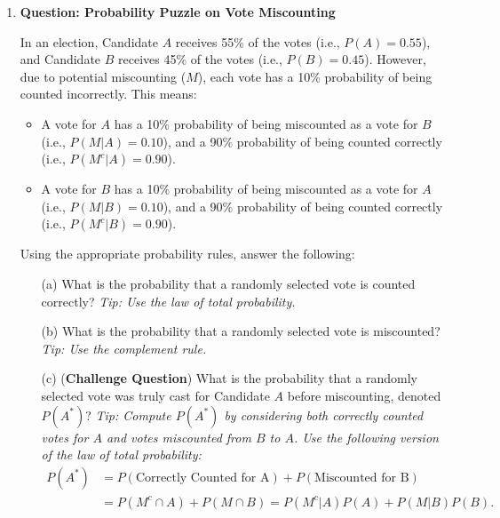 \documentclass{article}
\newcommand{\blankbox}[2][3cm]{%
    \vspace{-0.5em}
    \begin{figure}[H]
        \makebox[\linewidth]{%
            \begin{tcolorbox}[
                colback=white,
                colframe=black,
                width=#2, %
                height=#1,
                boxrule=0.2mm
            ]
            \end{tcolorbox}
        }
    \end{figure}
    \vspace{-1em}
}
\begin{document}
\begin{enumerate}
    \item \textbf{Question: Probability Puzzle on Vote Miscounting}

    In an election, Candidate \( A \) receives 55\% of the votes (i.e., $P(A)=0.55$), and Candidate \( B \) receives 45\% of the votes (i.e., $P(B)=0.45$). However, due to potential miscounting ($M$), each vote has a 10\% probability of being counted incorrectly. This means:
    \begin{itemize}
        \item A vote for \( A \) has a 10\% probability of being miscounted as a vote for \( B \) (i.e., \( P(M | A) = 0.10 \)), and a 90\% probability of being counted correctly (i.e., \( P(M^c | A) = 0.90 \)).
        \item A vote for \( B \) has a 10\% probability of being miscounted as a vote for \( A \) (i.e., \( P(M | B) = 0.10 \)), and a 90\% probability of being counted correctly (i.e., \( P(M^c | B) = 0.90 \)).
    \end{itemize}

    Using the appropriate probability rules, answer the following:

    \begin{enumerate}
        \item[(a)] What is the probability that a randomly selected vote is counted correctly?
        \textit{Tip: Use the law of total probability.}
        \blankbox[5cm]{1.1\textwidth}

        \item[(b)] What is the probability that a randomly selected vote is miscounted?
        \textit{Tip: Use the complement rule.}
        \blankbox[5cm]{1.1\textwidth}

        \item[(c)] (\textbf{Challenge Question}) What is the probability that a randomly selected vote was truly cast for Candidate \( A \) before miscounting, denoted \( P(A^*) \)?
        \textit{Tip: Compute \( P(A^*) \) by considering both correctly counted votes for \( A \) and votes miscounted from \( B \) to \( A \). Use the following version of the law of total probability:}
        \begin{align*}
         P(A^*) &= P(\text{Correctly Counted for A}) + P(\text{Miscounted for B})   \\
             & = P(M^c \cap A) + P(M \cap B) = P(M^c | A) P(A) + P(M | B) P(B).
        \end{align*} \vspace{-2em}
        \blankbox[5cm]{1.1\textwidth}


\end{enumerate}
\end{enumerate}
\end{document}
